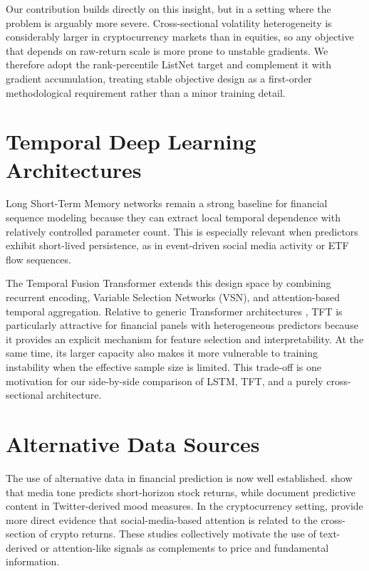 Our contribution builds directly on this insight, but in a setting where the
problem is arguably more severe.
Cross-sectional volatility heterogeneity is considerably larger in
cryptocurrency markets than in equities, so any objective that depends on
raw-return scale is more prone to unstable gradients.
We therefore adopt the rank-percentile ListNet target and complement it with
gradient accumulation, treating stable objective design as a first-order
methodological requirement rather than a minor training detail.

\section{Temporal Deep Learning Architectures}

Long Short-Term Memory networks \citep{hochreiter1997long,fischer2018lstm_finance}
remain a strong baseline for financial sequence modeling because they can
extract local temporal dependence with relatively controlled parameter count.
This is especially relevant when predictors exhibit short-lived persistence,
as in event-driven social media activity or ETF flow sequences.

The Temporal Fusion Transformer \citep{lim2021temporal} extends this design
space by combining recurrent encoding, Variable Selection Networks (VSN),
and attention-based temporal aggregation.
Relative to generic Transformer architectures \citep{vaswani2017attention},
TFT is particularly attractive for financial panels with heterogeneous
predictors because it provides an explicit mechanism for feature selection
and interpretability.
At the same time, its larger capacity also makes it more vulnerable to
training instability when the effective sample size is limited.
This trade-off is one motivation for our side-by-side comparison of LSTM,
TFT, and a purely cross-sectional architecture.

\section{Alternative Data Sources}

The use of alternative data in financial prediction is now well established.
\citet{tetlock2007giving} show that media tone predicts short-horizon stock
returns, while \citet{bollen2011twitter} document predictive content in
Twitter-derived mood measures.
In the cryptocurrency setting, \citet{maitre2025social} provide more direct
evidence that social-media-based attention is related to the cross-section of
crypto returns.
These studies collectively motivate the use of text-derived or attention-like
signals as complements to price and fundamental information.

